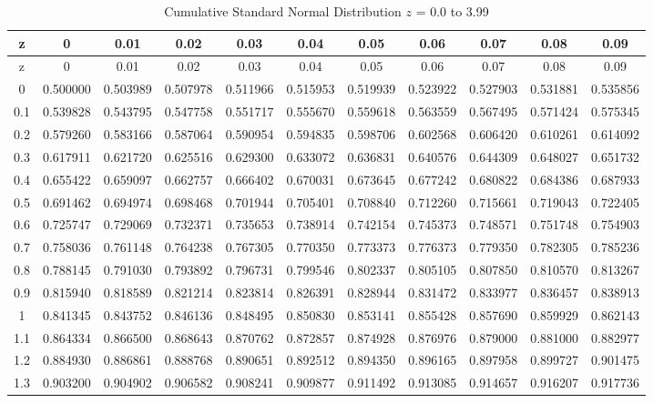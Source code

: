 \documentclass[
]{book}
\theoremstyle{definition}
\theoremstyle{definition}
\theoremstyle{definition}
\theoremstyle{definition}
\theoremstyle{remark}
\begin{document}
\hypertarget{appB:tab:N01b}{}
\begin{longtable}[]{@{}ccccccccccc@{}}
\caption{Cumulative Standard Normal Distribution \(z\) = 0.0 to 3.99}\tabularnewline
\toprule
z & 0 & 0.01 & 0.02 & 0.03 & 0.04 & 0.05 & 0.06 & 0.07 & 0.08 & 0.09 \\
\midrule
\endfirsthead
\toprule
z & 0 & 0.01 & 0.02 & 0.03 & 0.04 & 0.05 & 0.06 & 0.07 & 0.08 & 0.09 \\
\midrule
\endhead
0 & 0.500000 & 0.503989 & 0.507978 & 0.511966 & 0.515953 & 0.519939 & 0.523922 & 0.527903 & 0.531881 & 0.535856 \\
0.1 & 0.539828 & 0.543795 & 0.547758 & 0.551717 & 0.555670 & 0.559618 & 0.563559 & 0.567495 & 0.571424 & 0.575345 \\
0.2 & 0.579260 & 0.583166 & 0.587064 & 0.590954 & 0.594835 & 0.598706 & 0.602568 & 0.606420 & 0.610261 & 0.614092 \\
0.3 & 0.617911 & 0.621720 & 0.625516 & 0.629300 & 0.633072 & 0.636831 & 0.640576 & 0.644309 & 0.648027 & 0.651732 \\
0.4 & 0.655422 & 0.659097 & 0.662757 & 0.666402 & 0.670031 & 0.673645 & 0.677242 & 0.680822 & 0.684386 & 0.687933 \\
0.5 & 0.691462 & 0.694974 & 0.698468 & 0.701944 & 0.705401 & 0.708840 & 0.712260 & 0.715661 & 0.719043 & 0.722405 \\
0.6 & 0.725747 & 0.729069 & 0.732371 & 0.735653 & 0.738914 & 0.742154 & 0.745373 & 0.748571 & 0.751748 & 0.754903 \\
0.7 & 0.758036 & 0.761148 & 0.764238 & 0.767305 & 0.770350 & 0.773373 & 0.776373 & 0.779350 & 0.782305 & 0.785236 \\
0.8 & 0.788145 & 0.791030 & 0.793892 & 0.796731 & 0.799546 & 0.802337 & 0.805105 & 0.807850 & 0.810570 & 0.813267 \\
0.9 & 0.815940 & 0.818589 & 0.821214 & 0.823814 & 0.826391 & 0.828944 & 0.831472 & 0.833977 & 0.836457 & 0.838913 \\
1 & 0.841345 & 0.843752 & 0.846136 & 0.848495 & 0.850830 & 0.853141 & 0.855428 & 0.857690 & 0.859929 & 0.862143 \\
1.1 & 0.864334 & 0.866500 & 0.868643 & 0.870762 & 0.872857 & 0.874928 & 0.876976 & 0.879000 & 0.881000 & 0.882977 \\
1.2 & 0.884930 & 0.886861 & 0.888768 & 0.890651 & 0.892512 & 0.894350 & 0.896165 & 0.897958 & 0.899727 & 0.901475 \\
1.3 & 0.903200 & 0.904902 & 0.906582 & 0.908241 & 0.909877 & 0.911492 & 0.913085 & 0.914657 & 0.916207 & 0.917736 \\

\end{longtable}
\end{document}
